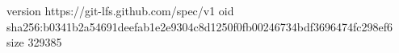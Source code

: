 version https://git-lfs.github.com/spec/v1
oid sha256:b0341b2a54691deefab1e2e9304c8d1250f0fb00246734bdf3696474fc298ef6
size 329385
